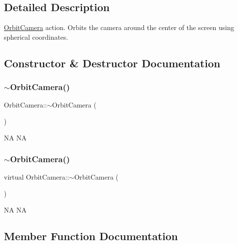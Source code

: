 \subsection{Detailed Description}
\hyperlink{classOrbitCamera}{Orbit\+Camera} action. Orbits the camera around the center of the screen using spherical coordinates. 

\subsection{Constructor \& Destructor Documentation}
\mbox{\label{classOrbitCamera_ad583133fce414fe8d52385dd262d272d}} 
\subsubsection{\texorpdfstring{$\sim$\+Orbit\+Camera()}{~OrbitCamera()}\hspace{0.1cm}{\footnotesize\ttfamily [1/2]}}
{\footnotesize\ttfamily Orbit\+Camera\+::$\sim$\+Orbit\+Camera (\begin{DoxyParamCaption}{ }\end{DoxyParamCaption})\hspace{0.3cm}{\ttfamily [virtual]}}

NA  NA \mbox{\label{classOrbitCamera_aa74b8b30c291121fa16fd67973a2bebd}} 
\subsubsection{\texorpdfstring{$\sim$\+Orbit\+Camera()}{~OrbitCamera()}\hspace{0.1cm}{\footnotesize\ttfamily [2/2]}}
{\footnotesize\ttfamily virtual Orbit\+Camera\+::$\sim$\+Orbit\+Camera (\begin{DoxyParamCaption}{ }\end{DoxyParamCaption})\hspace{0.3cm}{\ttfamily [virtual]}}

NA  NA 

\subsection{Member Function Documentation}
\mbox{\label{classOrbitCamera_aed66da45d80c719cf06f603875b89ed4}} 

